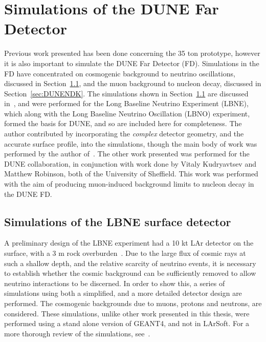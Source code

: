 

\chapter{Simulations of the DUNE Far Detector}  %
\graphicspath{{FarDetectorSimulations/Figs/Raster/}{FarDetectorSimulations/Figs/PDF/}{FarDetectorSimulations/Figs/Vector/}}

Previous work presented has been done concerning the 35 ton prototype, however it is also important to simulate the DUNE Far Detector (FD). Simulations in the FD have concentrated on cosmogenic background to neutrino oscillations, discussed in Section~\ref{sec:LBNESurf}, and the muon background to nucleon decay, discussed in Section~\ref{sec:DUNENDK}. The simulations shown in Section~\ref{sec:LBNESurf} are discussed in~\citep{MartinsThesis}, and were performed for the Long Baseline Neutrino Experiment (LBNE), which along with the Long Baseline Neutrino Oscillation (LBNO) experiment, formed the basis for DUNE, and so are included here for completeness. The author contributed by incorporating the \emph{complex} detector geometry, and the accurate surface profile, into the simulations, though the main body of work was performed by the author of~\citep{MartinsThesis}. The other work presented was performed for the DUNE collaboration, in conjunction with work done by Vitaly Kudryavtsev and Matthew Robinson, both of the University of Sheffield. This work was performed with the aim of producing muon-induced background limits to nucleon decay in the DUNE FD. \\

\section{Simulations of the LBNE surface detector} \label{sec:LBNESurf} %
A preliminary design of the LBNE experiment had a 10 kt LAr detector on the surface, with a 3 m rock overburden~\citep{LBNE6493}. Due to the large flux of cosmic rays at such a shallow depth, and the relative scarcity of neutrino events, it is necessary to establish whether the cosmic background can be sufficiently removed to allow neutrino interactions to be discerned. In order to show this, a series of simulations using both a simplified, and a more detailed detector design are performed. The cosmogenic backgrounds due to muons, protons and neutrons, are considered. These simulations, unlike other work presented in this thesis, were performed using a stand alone version of GEANT4, and not in LArSoft. For a more thorough review of the simulations, see~\citep{MartinsThesis}. \\

